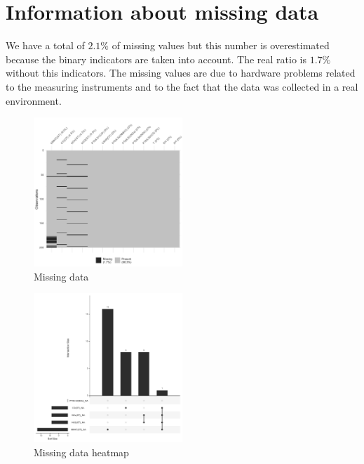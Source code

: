 \section{Information about missing data}
We have a total of $2.1\%$ of missing values but this number is overestimated because the binary indicators are taken into account. The real ratio is $1.7\%$
without this indicators.
The missing values are due to hardware problems related to the measuring instruments
and to the fact that the data was collected in a real environment.

\begin{figure}[H]
\centering
\includegraphics[width=0.5\textwidth]{figs/missing_values.png}
\caption{Missing data}
\label{fig:missing_data}
\end{figure}

\begin{figure}[H]
\centering
\includegraphics[width=0.5\textwidth]{figs/missing_values_heatmap.png}
\caption{Missing data heatmap}
\label{fig:missing_data_heatmap}
\end{figure}



